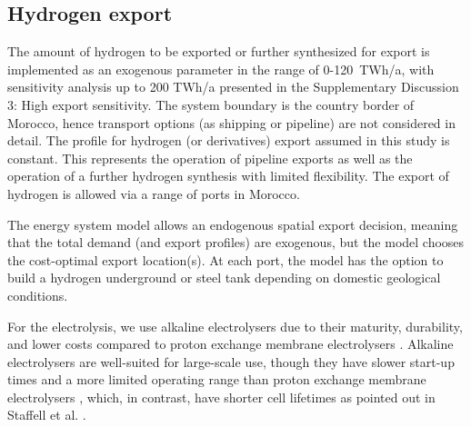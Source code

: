 \documentclass[5p,numafflabel]{elsarticle}
\begin{document}
\subsection*{Hydrogen export}
\label{subsec:hydrogen_export}
The amount of hydrogen to be exported or further synthesized for export is  implemented as an exogenous parameter in the range of 0-120~TWh/a, with sensitivity analysis up to 200 TWh/a presented in the Supplementary Discussion 3: High export sensitivity.
The system boundary is the country border of Morocco, hence transport options (as shipping or pipeline) are not considered in detail. The profile for hydrogen (or derivatives) export assumed in this study is constant. This represents the operation of pipeline exports as well as the operation of a further hydrogen synthesis with limited flexibility. The export of hydrogen is allowed via a range of ports in Morocco.


The energy system model allows an endogenous spatial export decision, meaning that the total demand (and export profiles) are exogenous, but the model chooses the  cost-optimal export location(s). At each port, the model has the option to build a hydrogen underground or steel tank depending on domestic geological conditions.

For the electrolysis, we use alkaline electrolysers due to their maturity, durability, and lower costs compared to proton exchange membrane electrolysers \cite{Staffell2019,DEA2019TechnologyData}.
Alkaline electrolysers are well-suited for large-scale use, though they have slower start-up times and a more limited operating range   
than proton exchange membrane electrolysers \cite{Staffell2019, Gotz2016}, which, in contrast, have  shorter cell lifetimes as pointed out in Staffell et al. \cite{Staffell2019}.







\end{document}
